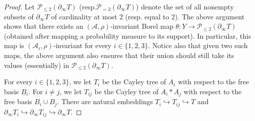 \documentclass[11pt]{article}
\newcommand{\resp}{resp.\xspace}
\numberwithin{equation}{section}
\let\mathcal\mathscr
\theoremstyle{plain}
\theoremstyle{definition}
\newcommand{\cala}{\mathcal{A}}
\newcommand{\calp}{\mathcal{P}}
\begin{document}
\begin{proof}
Let $\calp_{\le 2}(\partial_\infty T)$ (\resp $\calp_{=2}(\partial_\infty T)$) denote the set of all nonempty subsets of $\partial_\infty T$ of cardinality at most $2$ (\resp equal to $2$). The above argument shows that there exists an $(\cala,\rho)$-invariant Borel map $\theta:Y\to\calp_{\le 2}(\partial_\infty T)$ (obtained after mapping a probability measure to its support). In particular, this map is $(\cala_i,\rho)$-invariant for every $i\in\{1,2,3\}$. Notice also that given two such maps, the above argument also ensures that their union should still take its values (essentially) in $\calp_{\le 2}(\partial_\infty T)$.

For every $i\in\{1,2,3\}$, we let $T_i$ be the Cayley tree of $A_i$ with respect to the free basis $B_i$. For $i\neq j$, we let $T_{ij}$ be the Cayley tree of $A_i\ast A_j$ with respect to the free basis $B_i\cup B_j$. There are natural embeddings $T_i\hookrightarrow T_{ij}\hookrightarrow T$ and $\partial_\infty T_i\hookrightarrow\partial_\infty T_{ij}\hookrightarrow \partial_\infty T$.


\end{proof}
\end{document}
